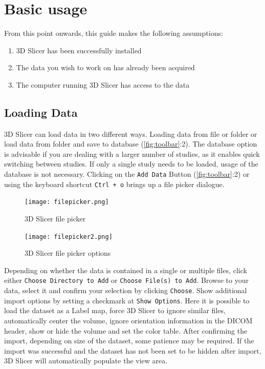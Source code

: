 \section{Basic usage}
\noindent
From this point onwards, this guide makes the following assumptions:
\begin{enumerate}
	\item 3D Slicer has been successfully installed
	\item The data you wish to work on has already been acquired
	\item The computer running 3D Slicer has access to the data
\end{enumerate}

\subsection{Loading Data}
3D Slicer can load data in two different ways.
Loading data from file or folder or load data from folder and save to database (\ref{fig:toolbar}:2).
The database option is advisable if you are dealing with a larger number of studies, as it enables quick switching between studies.
If only a single study needs to be loaded, usage of the database is not necessary.
Clicking on the \texttt{Add Data} Button (\ref{fig:toolbar}:2) or using the keyboard shortcut \texttt{Ctrl + o} brings up a file picker dialogue.
\begin{figure}[h!]
	\centerline{
		\texttt{[image: filepicker.png]}}
	\caption{3D Slicer file picker}\label{fig:filepicker}
\end{figure}

\begin{figure}[h!]
	\centerline{
		\texttt{[image: filepicker2.png]}}
	\caption{3D Slicer file picker options}\label{fig:filepicker2}
\end{figure}
\noindent
Depending on whether the data is contained in a single or multiple files, click either \texttt{Choose Directory to Add} or \texttt{Choose File(s) to Add}. Browse to your data, select it and confirm your selection by clicking \texttt{Choose}.
Show additional import options by setting a checkmark at \texttt{Show Options}.
Here it is possible to load the dataset as a Label map, force 3D Slicer to ignore similar files, automatically center the volume, ignore orientation information in the DICOM header, show or hide the volume and set the color table.
After confirming the import, depending on size of the dataset, some patience may be required. If the import was successful and the dataset has not been set to be hidden after import, 3D Slicer will automatically populate the view area.


